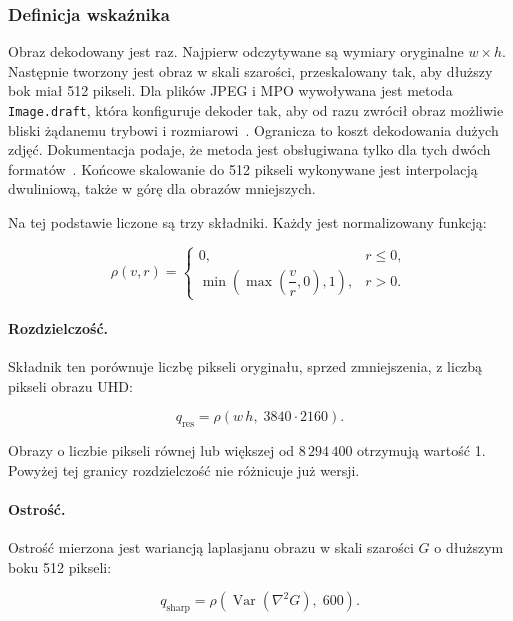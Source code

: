 \subsubsection{Definicja wskaźnika}

Obraz dekodowany jest raz. Najpierw odczytywane są wymiary
oryginalne \(w\times h\). Następnie tworzony jest obraz w skali
szarości, przeskalowany tak, aby dłuższy bok miał 512 pikseli.
Dla plików JPEG i MPO wywoływana jest metoda \texttt{Image.draft},
która konfiguruje dekoder tak, aby od razu zwrócił obraz możliwie
bliski żądanemu trybowi i rozmiarowi~\cite{pillow_image}. Ogranicza
to koszt dekodowania dużych zdjęć. Dokumentacja podaje, że metoda jest obsługiwana tylko dla tych
dwóch formatów~\cite{pillow_image}. Końcowe skalowanie do 512 pikseli
wykonywane jest interpolacją dwuliniową, także w górę dla obrazów
mniejszych.

Na tej podstawie liczone są trzy składniki. Każdy jest normalizowany
funkcją:

\begin{equation}
\label{eq:clamped-ratio}
\rho(v,r)=
\begin{cases}
0, & r\leq0,\\
\min\!\left(\max\!\left(\dfrac{v}{r},0\right),1\right), & r>0.
\end{cases}
\end{equation}

\paragraph{Rozdzielczość.}
Składnik ten porównuje liczbę pikseli oryginału, sprzed
zmniejszenia, z liczbą pikseli obrazu UHD:

\begin{equation}
\label{eq:q-resolution}
q_{\mathrm{res}}=\rho\!\left(w\,h,\;3840\cdot2160\right).
\end{equation}

Obrazy o liczbie pikseli równej lub większej od
\(8\,294\,400\) otrzymują wartość 1. Powyżej tej granicy
rozdzielczość nie różnicuje już wersji.

\paragraph{Ostrość.}
Ostrość mierzona jest wariancją laplasjanu obrazu w skali szarości
\(G\) o dłuższym boku 512 pikseli:

\begin{equation}
\label{eq:q-sharpness}
q_{\mathrm{sharp}}=\rho\!\left(\operatorname{Var}\!\left(\nabla^2 G\right),\;600\right).
\end{equation}

